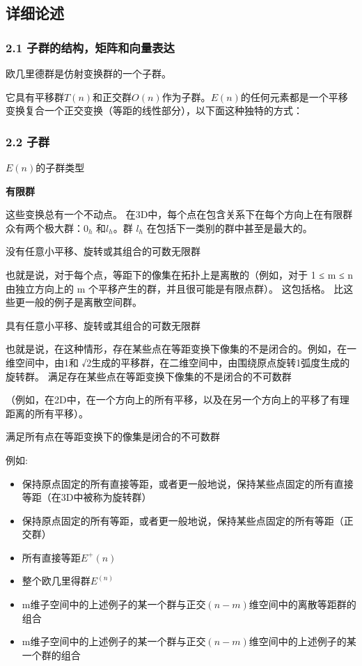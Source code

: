 \subsection{详细论述}



\subsubsection{2.1 子群的结构，矩阵和向量表达}

欧几里德群是仿射变换群的一个子群。

它具有平移群$T(n)$和正交群$O(n)$作为子群。$E(n)$的任何元素都是一个平移变换复合一个正交变换（等距的线性部分），以下面这种独特的方式：




\subsubsection{2.2 子群}

$E(n)$的子群类型

\textbf{有限群}

这些变换总有一个不动点。 在3D中，每个点在包含关系下在每个方向上在有限群众有两个极大群：$0_h$ 和$l_h$。群 $l_h$ 在包括下一类别的群中甚至是最大的。

没有任意小平移、旋转或其组合的可数无限群

也就是说，对于每个点，等距下的像集在拓扑上是离散的（例如，对于 1 ≤ m ≤ n 由独立方向上的 m 个平移产生的群，并且很可能是有限点群）。 这包括格。 比这些更一般的例子是离散空间群。

具有任意小平移、旋转或其组合的可数无限群

也就是说，在这种情形，存在某些点在等距变换下像集的不是闭合的。例如，在一维空间中，由1和 √2生成的平移群，在二维空间中，由围绕原点旋转1弧度生成的旋转群。
满足存在某些点在等距变换下像集的不是闭合的不可数群

（例如，在2D中，在一个方向上的所有平移，以及在另一个方向上的平移了有理距离的所有平移）。

满足所有点在等距变换下的像集是闭合的不可数群

例如:

\begin{itemize}
\item 保持原点固定的所有直接等距，或者更一般地说，保持某些点固定的所有直接等距（在3D中被称为旋转群）
\item 保持原点固定的所有等距，或者更一般地说，保持某些点固定的所有等距（正交群）
\item 所有直接等距$E^+(n)$
\item 整个欧几里得群$E^(n)$
\item m维子空间中的上述例子的某一个群与正交$(n-m)$维空间中的离散等距群的组合
\item m维子空间中的上述例子的某一个群与正交$(n-m)$维空间中的上述例子的某一个群的组合
\end{itemize}

